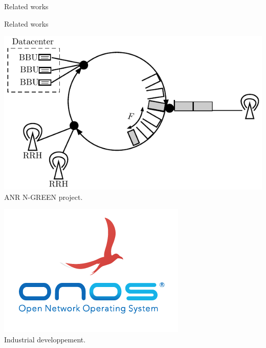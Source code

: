 \documentclass[10 pt]{beamer}
\begin{document}
\begin{section}{Related works}
\begin{frame}{Related works}
\centering
\begin{multicols}{2}

  \includegraphics[scale=0.4]{interface}\\
  
  ANR N-GREEN project.
  
   \includegraphics[scale=0.4]{onos}\\
   
   Industrial developpement.
   
  \end{multicols}
\end{frame}

\end{section}
\end{document}

